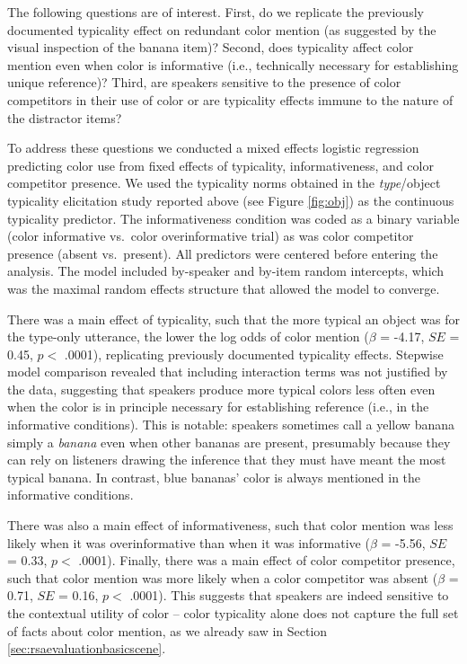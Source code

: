 \documentclass[11pt]{article}
\newcommand{\figref}[1]{Figure \ref{#1}}
\newcommand{\sectionref}[1]{Section \ref{#1}}
\begin{document}
The following questions are of interest. First, do we replicate the previously documented typicality effect on redundant color mention (as suggested by the visual inspection of the banana item)? Second, does typicality affect color mention even when color is informative (i.e., technically necessary for establishing unique reference)? Third, are speakers sensitive to the presence of color competitors in their use of color or are typicality effects immune to the nature of the distractor items?

To address these questions we conducted a mixed effects logistic regression predicting color use from fixed effects of typicality, informativeness, and color competitor presence. We used the typicality norms obtained in the \emph{type}/object typicality elicitation study reported above (see \figref{fig:obj}) as the continuous typicality predictor. The informativeness condition was coded as a binary variable (color informative vs.~color overinformative trial) as was color competitor presence (absent vs.~present). All predictors were centered before entering the analysis. The model included by-speaker and by-item random intercepts, which was the maximal random effects structure that allowed the model to converge.

There was a main effect of typicality, such that the more typical an object was for the type-only utterance, the lower the log odds of color mention ($\beta$ = -4.17, $SE$ = 0.45, $p <$ .0001), replicating previously documented typicality effects. Stepwise model comparison revealed that including interaction terms was not justified by the data, suggesting that speakers produce more typical colors less often even when the color is in principle necessary for establishing reference (i.e., in the informative conditions). This is notable: speakers sometimes call a yellow banana simply a \emph{banana} even when other bananas are present, presumably because they can rely on listeners drawing the inference that they must have meant the most typical banana. In contrast, blue bananas' color is always mentioned in the informative conditions.

There was also a main effect of informativeness, such that color mention was less likely when it was overinformative than when it was informative ($\beta$ = -5.56, $SE$ = 0.33, $p <$ .0001). Finally, there was a main effect of color competitor presence, such that color mention was more likely when a color competitor was absent  ($\beta$ = 0.71, $SE$ = 0.16, $p <$ .0001). This suggests that speakers are indeed sensitive to the contextual utility of color -- color typicality alone does not capture the full set of facts about color mention, as we already saw in \sectionref{sec:rsaevaluationbasicscene}.
\end{document}
